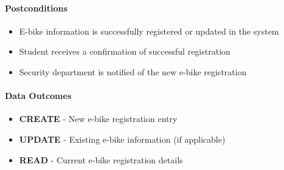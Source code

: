 \paragraph{Postconditions}
\begin{itemize}
    \item E-bike information is successfully registered or updated in the system
    \item Student receives a confirmation of successful registration
    \item Security department is notified of the new e-bike registration
\end{itemize}

\paragraph{Data Outcomes}
\begin{itemize}
    \item \textbf{CREATE} - New e-bike registration entry
    \item \textbf{UPDATE} - Existing e-bike information (if applicable)
    \item \textbf{READ} - Current e-bike registration details
\end{itemize}
